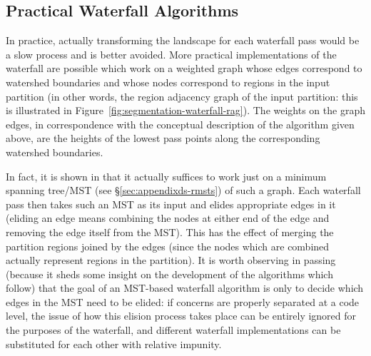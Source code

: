 
\subsection{Practical Waterfall Algorithms}
\label{subsec:segmentation-waterfall-practicalalgorithms}

In practice, actually transforming the landscape for each waterfall pass would be a slow process and is better avoided. More practical implementations of the waterfall are possible which work on a weighted graph whose edges correspond to watershed boundaries and whose nodes correspond to regions in the input partition (in other words, the region adjacency graph of the input partition: this is illustrated in Figure~\ref{fig:segmentation-waterfall-rag}). The weights on the graph edges, in correspondence with the conceptual description of the algorithm given above, are the heights of the lowest pass points along the corresponding watershed boundaries.


In fact, it is shown in \cite{marcotegui05} that it actually suffices to work just on a minimum spanning tree/MST (see \S\ref{sec:appendixds-rmsts}) of such a graph. Each waterfall pass then takes such an MST as its input and elides appropriate edges in it (eliding an edge means combining the nodes at either end of the edge and removing the edge itself from the MST). This has the effect of merging the partition regions joined by the edges (since the nodes which are combined actually represent regions in the partition). It is worth observing in passing (because it sheds some insight on the development of the algorithms which follow) that the goal of an MST-based waterfall algorithm is only to decide which edges in the MST need to be elided: if concerns are properly separated at a code level, the issue of how this elision process takes place can be entirely ignored for the purposes of the waterfall, and different waterfall implementations can be substituted for each other with relative impunity.


